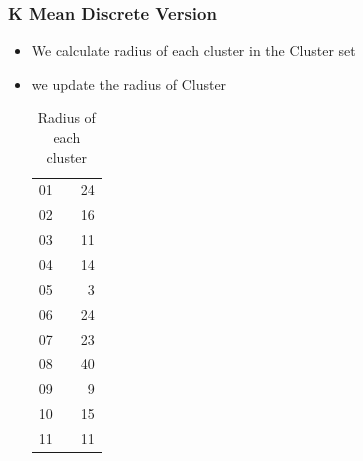 \documentclass[blue]{beamer}
\begin{document}
\begin{frame}
 \frametitle{K Mean Discrete Version}
 \begin{itemize}
  \item We calculate radius of each cluster in the Cluster set
  \item we update the radius of Cluster
  \tiny
  \begin{table}[H]
     \centering
      \vspace{2ex}
          \caption{Radius of each cluster} 
               \begin{tabular}{||l|c|r||} \hline
                     {\color{red}{Cluster}} & {\color{red}{Radius}} & {\color{red}{size}} \\ \hline
                         01 & {\color{blue}{36.2353}} & 24 \\ \hline
                         02 & {\color{blue}{26.4197}} & 16 \\ \hline
                         03 & {\color{blue}{28.3019}} & 11 \\ \hline
                         04 & {\color{blue}{19.2354}} & 14 \\ \hline
                         05 & {\color{blue}{14.0357}} & 3 \\ \hline
                         06 & {\color{blue}{35.4683}} & 24 \\ \hline
                         07 & {\color{blue}{25.4591}} & 23 \\ \hline
                         08 & {\color{blue}{40.6079}} & 40 \\ \hline
                         09 & {\color{blue}{17.8885}} & 9 \\ \hline
                         10 & {\color{blue}{28.0179}} & 15 \\ \hline
                         11 & {\color{blue}{19.2094}} & 11 \\ \hline
                         
                 \end{tabular}
          \end{table}
  \end{itemize}
\end{frame}
\end{document}
